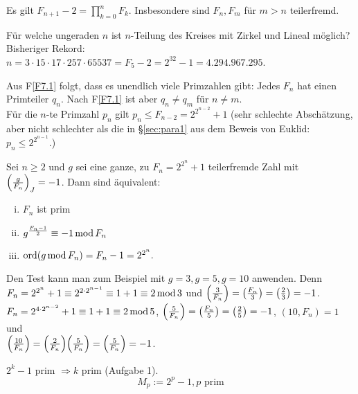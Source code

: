 \begin{falko} \label{F7.1}
	Es gilt $F_{n+1} - 2 = \prod_{k=0}^{n} F_k$. Insbesondere sind $F_n,F_m$ für $m > n$ teilerfremd.
\end{falko}

Für welche ungeraden $n$ ist $n$-Teilung des Kreises mit Zirkel und Lineal möglich? Bisheriger Rekord:\\
$n = 3 \cdot 15 \cdot 17 \cdot 257 \cdot 65537 = F_5 - 2 = 2^{32} - 1 = 4.294.967.295$.

	Aus F\ref{F7.1} folgt, dass es unendlich viele Primzahlen gibt: Jedes $F_n$ hat einen Primteiler $q_n$. Nach F\ref{F7.1} ist aber $q_n \neq q_m$ für $n \neq m$. \\
	Für die $n$-te Primzahl $p_n$ gilt $p_n \leq F_{n-2} = 2^{2^{n-2}}+1$ (sehr schlechte Abschätzung, aber nicht schlechter als die in §\ref{sec:para1} aus dem Beweis von Euklid: $p_n \leq 2^{2^{n-1}}$.)
	
\begin{falko} \label{F7.2}
	Sei $n \geq 2$ und $g$ sei eine ganze, zu $F_n = 2^{2^n} + 1$ teilerfremde Zahl mit $\left(\frac{g}{F_n}\right)_J = -1$. Dann sind äquivalent: \begin{enumerate}[(i)]
		\item $F_n$ ist prim 
		\item $g^{\frac{F_n-1}{2}} \equiv -1 \operatorname{mod} F_n$
		\item $\operatorname{ord}(g \operatorname{mod} F_n) = F_n - 1 = 2^{2^n}.$
	\end{enumerate}
\end{falko}

	Den Test kann man zum Beispiel mit $g = 3, g= 5, g=10$ anwenden. Denn $F_n = 2^{2^n} + 1 \equiv 2^{2 \cdot 2^{n-1}} \equiv 1 + 1 \equiv 2 \operatorname{mod} 3$ und $\left(\frac{3}{F_n}\right) = \left(\frac{F_n}{3}\right) = \left(\frac{2}{3}\right) = -1$. \\
	$F_n = 2^{4 \cdot 2^{n-2}} + 1 \equiv 1 + 1 \equiv 2 \operatorname{mod} 5$, $\left(\frac{5}{F_n}\right) = \left(\frac{F_n}{5}\right) = \left(\frac{2}{5}\right) = -1$, $(10, F_n) = 1$ und \\ $\leg{10}{F_n} = \leg{2}{F_n} \leg{5}{F_n} = \leg{5}{F_n} = -1$.

	$2^k - 1$ prim $\Rightarrow k$ prim (Aufgabe 1).
	\[ M_p := 2^p - 1, p \text{ prim} \]

